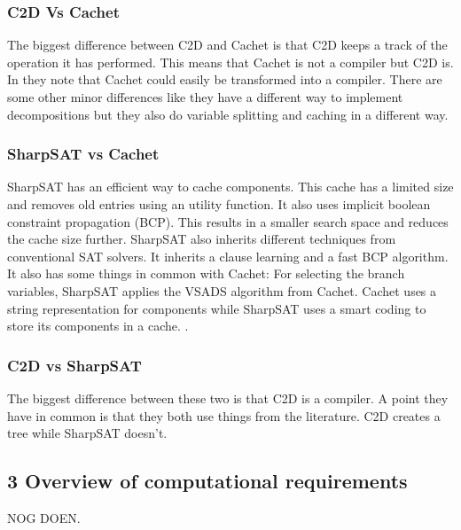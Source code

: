 \documentclass[a4paper,10pt]{report}
\begin{document}
\subsubsection*{C2D Vs Cachet}

The biggest difference between C2D and Cachet is that C2D keeps a track of the operation it has performed. This means that Cachet is not a compiler but C2D is. In \cite{CHAVIRA2008772} they note that Cachet could easily be transformed into a compiler. There are some other minor differences like they have a different way to implement decompositions but they also do variable splitting and caching in a different way.


\subsubsection*{SharpSAT vs Cachet}
SharpSAT has an efficient way to cache components. This cache has a limited size and removes old entries using an utility function.
It also uses implicit boolean constraint propagation (BCP). This results in a smaller search space and reduces the cache size further.
SharpSAT also inherits different techniques from conventional SAT solvers. It inherits a clause learning and a fast BCP algorithm. It also has some things in common with Cachet: For selecting the branch variables, SharpSAT applies the VSADS algorithm from Cachet.
Cachet uses a string representation for components while SharpSAT uses a smart coding to store its components in a cache. \cite{SharpSAT}.

\subsubsection*{C2D vs SharpSAT}
The biggest difference between these two is that C2D is a compiler. A point they have in common is that they both use things from the literature. C2D creates a tree while SharpSAT doesn't.

\subsection*{3 Overview of computational requirements}
NOG DOEN.



\end{document}
